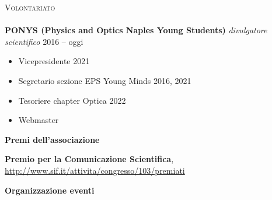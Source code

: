 \documentclass[a4paper]{article}
\newcommand{\lineunder} {
  \vspace*{-8pt} \\
  \hspace*{-18pt} \hrulefill \\
}
\newcommand{\header} [1] {
  {\hspace*{-18pt}\vspace*{6pt} \textsc{#1}}
  \vspace*{-6pt} \lineunder
}
\begin{document}
\header{Volontariato}
\textbf{PONYS (Physics and Optics Naples Young Students)}
{\sl divulgatore scientifico} \hfill 2016 -- oggi\\
\vspace{2mm}
\begin{itemize}
  \item Vicepresidente \hfill 2021
  \item Segretario sezione EPS Young Minds \hfill 2016, 2021
  \item Tesoriere chapter Optica \hfill 2022
  \item Webmaster
\end{itemize}

\pagebreak

\begin{addmargin}[2em]{0em}%
\textbf{Premi dell'associazione}

\begin{description} \itemsep 1pt
  \item [2017] \textbf{Premio per la Comunicazione Scientifica},
        \url{http://www.sif.it/attivita/congresso/103/premiati}
\end{description}

\textbf{Organizzazione eventi}


\end{addmargin}
\end{document}
